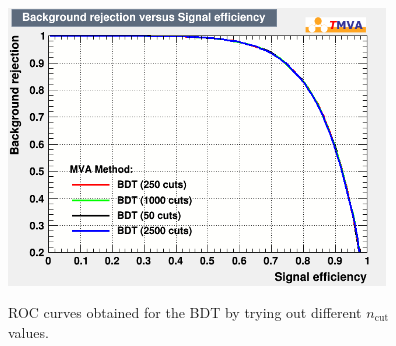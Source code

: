 \documentclass[a4paper, 10pt, openright]{report}
\begin{document}
\begin{appendices}

\begin{figure}[htbp]
\centering
\includegraphics[width=10cm, height=8cm]{figs/BDT_cuts.png}
\caption{\ac{ROC} curves obtained for the \ac{BDT} by trying out different $n_{\text{cut}}$ values.}
\label{fig:optCuts}
\end{figure}  


\end{appendices}
\end{document}
